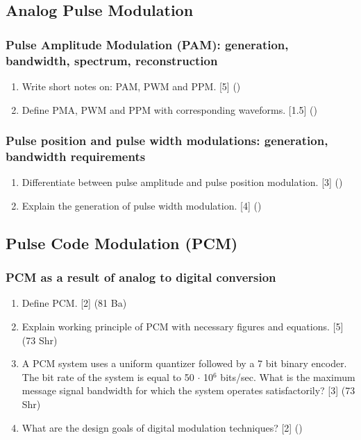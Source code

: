 \documentclass[12pt]{article}
\begin{document}
  \subsection{Analog Pulse Modulation}
    \subsubsection{Pulse Amplitude Modulation (PAM): generation, bandwidth, spectrum, reconstruction}
    	\begin{enumerate}
    		\item Write short notes on: PAM, PWM and PPM. \hfill [5] ()
    		
    		\item Define PMA, PWM and PPM with corresponding waveforms. \hfill [1.5] ()
    	\end{enumerate}
    
    \subsubsection{Pulse position and pulse width modulations: generation, bandwidth requirements}
    \begin{enumerate}
    	\item Differentiate between pulse amplitude and pulse position modulation. \hfill [3] ()
    	
    	\item Explain the generation of pulse width modulation. \hfill [4] ()
    \end{enumerate}
    
  \subsection{Pulse Code Modulation (PCM)}
    \subsubsection{PCM as a result of analog to digital conversion}
    	\begin{enumerate}
    		\item Define PCM. \hfill [2] (81 Ba)
    		
    		\item Explain working principle of PCM with necessary figures and equations. \hfill [5] (73 Shr)
    		
    		\item A PCM system uses a uniform quantizer followed by a 7 bit binary encoder. The bit rate of the system is equal to 50 $\cdot$ 10$^6$ bits/sec. What is the maximum message signal bandwidth for which the system operates satisfactorily? \hfill [3] (73 Shr)
    		
    		\item What are the design goals of digital modulation techniques? \hfill [2] ()
    	\end{enumerate}
    
\end{document}
